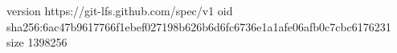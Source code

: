 version https://git-lfs.github.com/spec/v1
oid sha256:6ac47b9617766f1ebef027198b626b6d6fc6736e1a1afe06afb0c7cbc6176231
size 1398256
